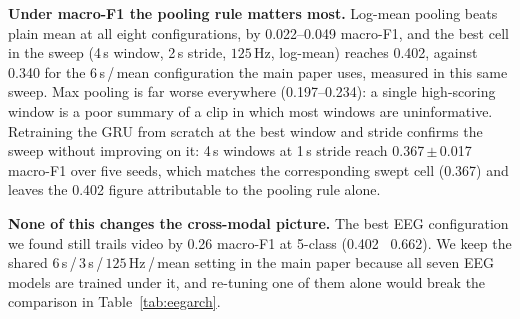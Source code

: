 \noindent\textbf{Under macro-F1 the pooling rule matters most.}
Log-mean pooling beats plain mean at all eight configurations, by 0.022--0.049
macro-F1, and the best cell in the sweep (4\,s window, 2\,s stride, $125$\,Hz,
log-mean) reaches 0.402, against 0.340 for the $6$\,s\,/\,mean configuration the main
paper uses, measured in this same sweep. Max
pooling is far worse everywhere (0.197--0.234): a single high-scoring window is a poor
summary of a clip in which most windows are uninformative. Retraining the GRU from
scratch at the best window and stride confirms the sweep without improving on it:
4\,s windows at 1\,s stride reach 0.367\,$\pm$\,0.017 macro-F1 over five seeds, which
matches the corresponding swept cell (0.367) and leaves the 0.402 figure attributable
to the pooling rule alone.

\noindent\textbf{None of this changes the cross-modal picture.}
The best EEG configuration we found still trails video by 0.26 macro-F1 at 5-class
(0.402 \vs\ 0.662). We keep the shared $6$\,s\,/\,$3$\,s\,/\,$125$\,Hz\,/\,mean
setting in the main paper because all seven EEG models are trained under it, and
re-tuning one of them alone would break the comparison in Table~\ref{tab:eegarch}.

